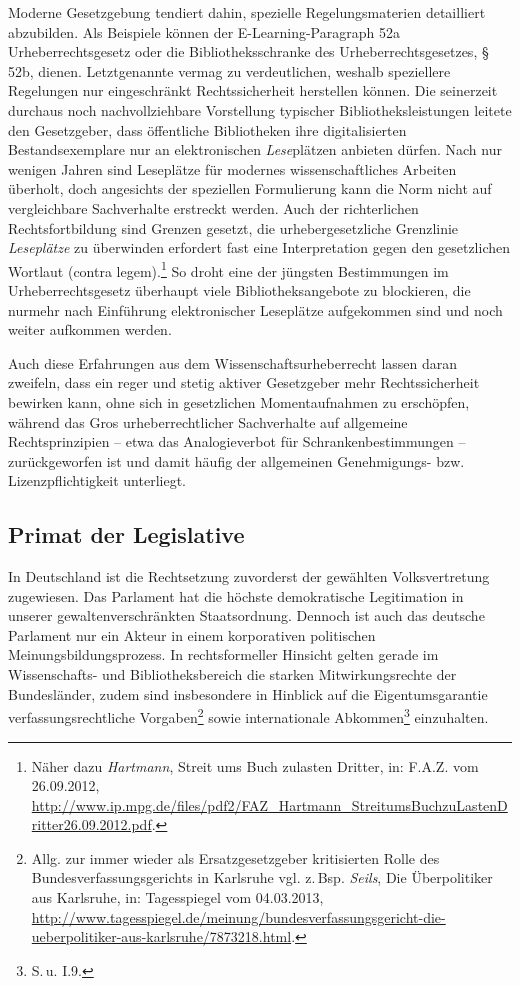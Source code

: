 \documentclass[output=paper]{langscibook}
\begin{document}
Moderne Gesetzgebung tendiert dahin, spezielle Regelungsmaterien
detailliert abzubilden. Als Beispiele können der E-Learning-Paragraph
52a Urheberrechtsgesetz oder die Bibliotheksschranke des
Urheberrechtsgesetzes, §\,52b, dienen. Letztgenannte vermag zu
verdeutlichen, weshalb speziellere Regelungen nur eingeschränkt
Rechtssicherheit herstellen können. Die seinerzeit durchaus noch
nachvollziehbare Vorstellung typischer Bibliotheksleistungen leitete den
Gesetzgeber, dass öffentliche Bibliotheken ihre digitalisierten
Bestandsexemplare nur an elektronischen \emph{Lese}plätzen anbieten
dürfen. Nach nur wenigen Jahren sind Leseplätze für modernes
wissenschaftliches Arbeiten überholt, doch angesichts der speziellen
Formulierung kann die Norm nicht auf vergleichbare Sachverhalte
erstreckt werden. Auch der richterlichen Rechtsfortbildung sind Grenzen
gesetzt, die urhebergesetzliche Grenzlinie \emph{Leseplätze} zu
überwinden erfordert fast eine Interpretation gegen den gesetzlichen
Wortlaut (contra legem).\footnote{Näher dazu \emph{Hartmann}, Streit ums
  Buch zulasten Dritter, in: F.A.Z. vom 26.09.2012,
  \url{http://www.ip.mpg.de/files/pdf2/FAZ_Hartmann_StreitumsBuchzuLastenDritter26.09.2012.pdf}.}
So droht eine der jüngsten Bestimmungen im Urheberrechtsgesetz überhaupt
viele Bibliotheksangebote zu blockieren, die nurmehr nach Einführung
elektronischer Leseplätze aufgekommen sind und noch weiter aufkommen
werden.

Auch diese Erfahrungen aus dem Wissenschaftsurheberrecht lassen daran
zweifeln, dass ein reger und stetig aktiver Gesetzgeber mehr
Rechtssicherheit bewirken kann, ohne sich in gesetzlichen
Momentaufnahmen zu erschöpfen, während das Gros urheberrechtlicher
Sachverhalte auf allgemeine Rechtsprinzipien -- etwa das Analogieverbot
für Schrankenbestimmungen --zurückgeworfen ist und damit häufig der
allgemeinen Genehmigungs- bzw. Lizenzpflichtigkeit unterliegt.

\hypertarget{primat-der-legislative}{%
\subsection{Primat der Legislative}\label{primat-der-legislative}}

In Deutschland ist die Rechtsetzung zuvorderst der gewählten
Volksvertretung zugewiesen. Das Parlament hat die höchste demokratische
Legitimation in unserer gewaltenverschränkten Staatsordnung. Dennoch ist
auch das deutsche Parlament nur ein Akteur in einem korporativen
politischen Meinungsbildungsprozess. In rechtsformeller Hinsicht gelten
gerade im Wissenschafts- und Bibliotheksbereich die starken
Mitwirkungsrechte der Bundesländer, zudem sind insbesondere in Hinblick
auf die Eigentumsgarantie verfassungsrechtliche Vorgaben\footnote{Allg.
  zur immer wieder als Ersatzgesetzgeber kritisierten Rolle des
  Bundesverfassungsgerichts in Karlsruhe vgl. z.\,Bsp. \emph{Seils}, Die
  Überpolitiker aus Karlsruhe, in: Tagesspiegel vom 04.03.2013,
  \url{http://www.tagesspiegel.de/meinung/bundesverfassungsgericht-die-ueberpolitiker-aus-karlsruhe/7873218.html}.}
sowie internationale Abkommen\footnote{S.\,u. I.9.} einzuhalten.
\end{document}
